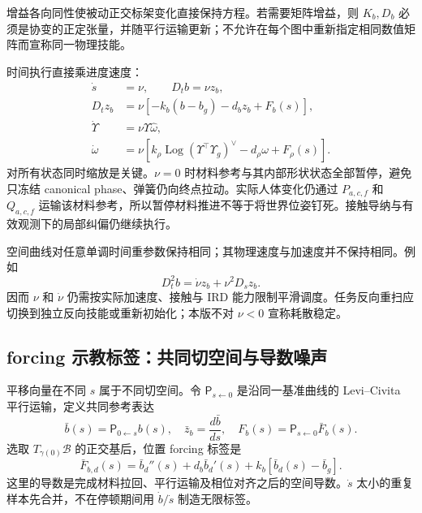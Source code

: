 \documentclass[11pt,a4paper]{article}
\numberwithin{equation}{section}
\theoremstyle{definition}
\begin{document}
增益各向同性使被动正交标架变化直接保持方程。若需要矩阵增益，则 $K_b,D_b$ 必须是协变的正定张量，并随平行运输更新；不允许在每个图中重新指定相同数值矩阵而宣称同一物理技能。

时间执行直接乘进度速度：
\begin{align}
 \dot s&=\nu,\qquad D_tb=\nu z_b,\\
 D_tz_b&=\nu[-k_b(b-b_g)-d_bz_b+F_b(s)],\\
 \dot\Upsilon&=\nu\Upsilon\widehat\omega,\\
 \dot\omega&=\nu[k_\rho\operatorname{Log}(\Upsilon^\top\Upsilon_g)^\vee
                    -d_\rho\omega+F_\rho(s)].
 \label{eq:v43-time-generator}
\end{align}
对所有状态同时缩放是关键。$\nu=0$ 时材料参考与其内部形状状态全部暂停，避免只冻结 canonical phase、弹簧仍向终点拉动。实际人体变化仍通过 $P_{a,c,f}$ 和 $Q_{a,c,f}$ 运输该材料参考，所以暂停材料推进不等于将世界位姿钉死。接触导纳与有效观测下的局部纠偏仍继续执行。

空间曲线对任意单调时间重参数保持相同；其物理速度与加速度并不保持相同。例如
\begin{equation}
 D_t^2 b=\dot\nu z_b+\nu^2D_sz_b.
 \label{eq:v43-time-acceleration}
\end{equation}
因而 $\nu$ 和 $\dot\nu$ 仍需按实际加速度、接触与 IRD 能力限制平滑调度。任务反向重扫应切换到独立反向技能或重新初始化；本版不对 $\nu<0$ 宣称耗散稳定。

\subsection{forcing 示教标签：共同切空间与导数噪声}
平移向量在不同 $s$ 属于不同切空间。令 $\mathsf P_{s\leftarrow0}$ 是沿同一基准曲线的 Levi--Civita 平行运输，定义共同参考表达
\begin{equation}
 \bar b(s)=\mathsf P_{0\leftarrow s}b(s),\quad
 \bar z_b=\frac{d\bar b}{ds},\quad
 F_b(s)=\mathsf P_{s\leftarrow0}\bar F_b(s).
 \label{eq:v43-common-tangent}
\end{equation}
选取 $T_{\gamma(0)}\mathcal B$ 的正交基后，位置 forcing 标签是
\begin{equation}
 \boxed{\bar F_{b,d}(s)=\bar b_d''(s)
      +d_b\bar b_d'(s)+k_b[\bar b_d(s)-\bar b_g].}
 \label{eq:v43-position-label}
\end{equation}
这里的导数是完成材料拉回、平行运输及相位对齐之后的空间导数。$\dot s$ 太小的重复样本先合并，不在停顿期间用 $\dot b/\dot s$ 制造无限标签。
\end{document}
